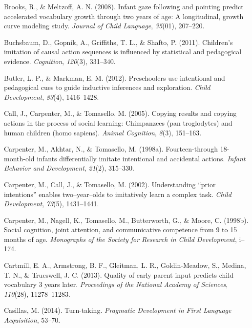 \documentclass[oneside]{report}
\begin{document}
\leavevmode\hypertarget{ref-brooks2008infant}{}%
Brooks, R., \& Meltzoff, A. N. (2008). Infant gaze following and
pointing predict accelerated vocabulary growth through two years of age:
A longitudinal, growth curve modeling study. \emph{Journal of Child
Language}, \emph{35}(01), 207--220.

\leavevmode\hypertarget{ref-buchsbaum2011children}{}%
Buchsbaum, D., Gopnik, A., Griffiths, T. L., \& Shafto, P. (2011).
Children's imitation of causal action sequences is influenced by
statistical and pedagogical evidence. \emph{Cognition}, \emph{120}(3),
331--340.

\leavevmode\hypertarget{ref-butler2012preschoolers}{}%
Butler, L. P., \& Markman, E. M. (2012). Preschoolers use intentional
and pedagogical cues to guide inductive inferences and exploration.
\emph{Child Development}, \emph{83}(4), 1416--1428.

\leavevmode\hypertarget{ref-call2005copying}{}%
Call, J., Carpenter, M., \& Tomasello, M. (2005). Copying results and
copying actions in the process of social learning: Chimpanzees (pan
troglodytes) and human children (homo sapiens). \emph{Animal Cognition},
\emph{8}(3), 151--163.

\leavevmode\hypertarget{ref-carpenter1998fourteen}{}%
Carpenter, M., Akhtar, N., \& Tomasello, M. (1998a). Fourteen-through
18-month-old infants differentially imitate intentional and accidental
actions. \emph{Infant Behavior and Development}, \emph{21}(2), 315--330.

\leavevmode\hypertarget{ref-carpenter2002understanding}{}%
Carpenter, M., Call, J., \& Tomasello, M. (2002). Understanding ``prior
intentions'' enables two--year--olds to imitatively learn a complex
task. \emph{Child Development}, \emph{73}(5), 1431--1441.

\leavevmode\hypertarget{ref-carpenter1998social}{}%
Carpenter, M., Nagell, K., Tomasello, M., Butterworth, G., \& Moore, C.
(1998b). Social cognition, joint attention, and communicative competence
from 9 to 15 months of age. \emph{Monographs of the Society for Research
in Child Development}, i--174.

\leavevmode\hypertarget{ref-cartmill2013quality}{}%
Cartmill, E. A., Armstrong, B. F., Gleitman, L. R., Goldin-Meadow, S.,
Medina, T. N., \& Trueswell, J. C. (2013). Quality of early parent input
predicts child vocabulary 3 years later. \emph{Proceedings of the
National Academy of Sciences}, \emph{110}(28), 11278--11283.

\leavevmode\hypertarget{ref-casillas2014turn}{}%
Casillas, M. (2014). Turn-taking. \emph{Pragmatic Development in First
Language Acquisition}, 53--70.
\end{document}
